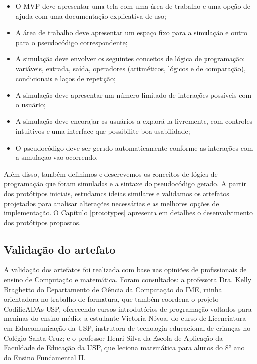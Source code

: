 \begin{itemize}
    \item O MVP deve apresentar uma tela com uma área de trabalho e uma opção de ajuda com uma documentação explicativa de uso;
    \item A área de trabalho deve apresentar um espaço fixo para a simulação e outro para o pseudocódigo correspondente;
    \item A simulação deve envolver os seguintes conceitos de lógica de programação: variáveis, entrada, saída, operadores (aritméticos, lógicos e de comparação), condicionais e laços de repetição;
    \item A simulação deve apresentar um número limitado de interações possíveis com o usuário;
    \item A simulação deve encorajar os usuários a explorá-la livremente, com controles intuitivos e uma interface que possibilite boa usabilidade;
    \item O pseudocódigo deve ser gerado automaticamente conforme as interações com a simulação vão ocorrendo.
\end{itemize}

Além disso, também definimos e descrevemos os conceitos de lógica de programação que foram simulados e a sintaxe do pseudocódigo gerado. A partir dos protótipos iniciais, estudamos ideias similares e validamos os artefatos projetados para analisar alterações necessárias e as melhores opções de implementação. O Capítulo \ref{prototypes} apresenta em detalhes o desenvolvimento dos protótipos propostos.

\subsection{Validação do artefato} \label{validation}
A validação dos artefatos foi realizada com base nas opiniões de profissionais de ensino de Computação e matemática. Foram consultados: a professora Dra. Kelly Braghetto do Departamento de Ciência da Computação do IME, minha orientadora no trabalho de formatura, que também coordena o projeto CodificADAs USP, oferecendo cursos introdutórios de programação voltados para meninas do ensino médio; a estudante Victoria Nóvoa, do curso de Licenciatura em Educomunicação da USP, instrutora de tecnologia educacional de crianças no Colégio Santa Cruz; e o professor Henri Silva da Escola de Aplicação da Faculdade de Educação da USP, que leciona matemática para alunos do 8° ano do Ensino Fundamental II.

